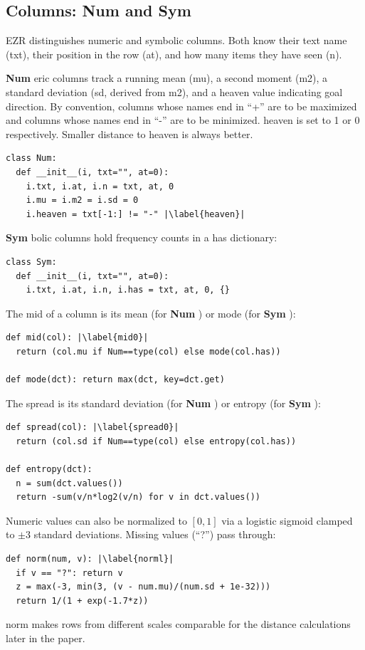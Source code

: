 \documentclass[AMA,STIX2COL]{WileyNJDv5}
\newcommand{\IT}{{\sffamily EZR}}
\newcommand{\cls}[1]{%
  \setlength{\fboxsep}{1.5pt}%
  \colorbox{clsbg}{\sffamily\bfseries{#1}}%
}
\begin{document}
\subsection{Columns: \cls{Num} and \cls{Sym}}

\IT{} distinguishes numeric and symbolic columns. Both know
their text name (\textsf{txt}), their position in the row
(\textsf{at}), and how many items they have seen (\textsf{n}).

\cls{Num}eric columns track a running mean (\textsf{mu}), a
second moment (\textsf{m2}), a standard deviation (\textsf{sd},
derived from \textsf{m2}), and a \textsf{heaven} value
indicating goal direction. By convention, columns whose names
end in ``+'' are to be maximized and columns whose names end in
``-'' are to be minimized. \textsf{heaven} is set to 1 or 0
respectively. Smaller distance to \textsf{heaven} is always
better.
\begin{verbatim}
class Num:
  def __init__(i, txt="", at=0):
    i.txt, i.at, i.n = txt, at, 0
    i.mu = i.m2 = i.sd = 0
    i.heaven = txt[-1:] != "-" |\label{heaven}|
\end{verbatim}
\cls{Sym}bolic columns hold frequency counts in a \textsf{has}
dictionary:
\begin{verbatim}
class Sym:
  def __init__(i, txt="", at=0):
    i.txt, i.at, i.n, i.has = txt, at, 0, {}
\end{verbatim}
The \textsf{mid} of a column is its mean (for \cls{Num}) or
mode (for \cls{Sym}):
\begin{verbatim}
def mid(col): |\label{mid0}|
  return (col.mu if Num==type(col) else mode(col.has))

def mode(dct): return max(dct, key=dct.get)
\end{verbatim}
The \textsf{spread} is its standard deviation (for \cls{Num})
or entropy (for \cls{Sym}):
\begin{verbatim}
def spread(col): |\label{spread0}|
  return (col.sd if Num==type(col) else entropy(col.has))

def entropy(dct):
  n = sum(dct.values())
  return -sum(v/n*log2(v/n) for v in dct.values())
\end{verbatim}
Numeric values can also be normalized to $[0,1]$ via a logistic
sigmoid clamped to $\pm3$ standard deviations. Missing values
(``?'') pass through:
\begin{verbatim}
def norm(num, v): |\label{norml}|
  if v == "?": return v
  z = max(-3, min(3, (v - num.mu)/(num.sd + 1e-32)))
  return 1/(1 + exp(-1.7*z))
\end{verbatim}
\textsf{norm} makes rows from different scales comparable for
the distance calculations later in the paper.
\end{document}
